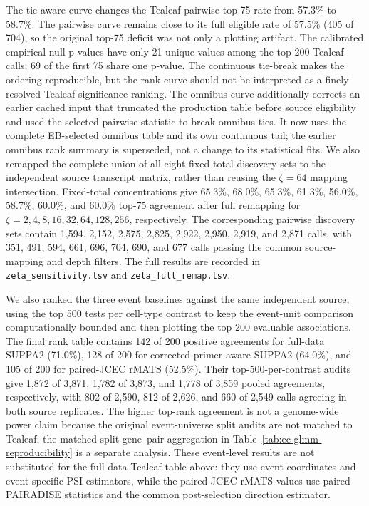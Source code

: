 \documentclass[11pt]{article}
\begin{document}
The tie-aware curve changes the Tealeaf pairwise top-75 rate from 57.3\% to 58.7\%. The pairwise curve remains close to its full eligible rate of 57.5\% (405 of 704), so the original top-75 deficit was not only a plotting artifact. The calibrated empirical-null p-values have only 21 unique values among the top 200 Tealeaf calls; 69 of the first 75 share one p-value. The continuous tie-break makes the ordering reproducible, but the rank curve should not be interpreted as a finely resolved Tealeaf significance ranking. The omnibus curve additionally corrects an earlier cached input that truncated the production table before source eligibility and used the selected pairwise statistic to break omnibus ties. It now uses the complete EB-selected omnibus table and its own continuous tail; the earlier omnibus rank summary is superseded, not a change to its statistical fits. We also remapped the complete union of all eight fixed-total discovery sets to the independent source transcript matrix, rather than reusing the \(\zeta=64\) mapping intersection. Fixed-total concentrations give 65.3\%, 68.0\%, 65.3\%, 61.3\%, 56.0\%, 58.7\%, 60.0\%, and 60.0\% top-75 agreement after full remapping for \(\zeta=2,4,8,16,32,64,128,256\), respectively. The corresponding pairwise discovery sets contain 1,594, 2,152, 2,575, 2,825, 2,922, 2,950, 2,919, and 2,871 calls, with 351, 491, 594, 661, 696, 704, 690, and 677 calls passing the common source-mapping and depth filters. The full results are recorded in \texttt{zeta\_sensitivity.tsv} and \texttt{zeta\_full\_remap.tsv}.

We also ranked the three event baselines against the same independent source, using the top 500 tests per cell-type contrast to keep the event-unit comparison computationally bounded and then plotting the top 200 evaluable associations. The final rank table contains 142 of 200 positive agreements for full-data SUPPA2 (71.0\%), 128 of 200 for corrected primer-aware SUPPA2 (64.0\%), and 105 of 200 for paired-JCEC rMATS (52.5\%). Their top-500-per-contrast audits give 1,872 of 3,871, 1,782 of 3,873, and 1,778 of 3,859 pooled agreements, respectively, with 802 of 2,590, 812 of 2,626, and 660 of 2,549 calls agreeing in both source replicates. The higher top-rank agreement is not a genome-wide power claim because the original event-universe split audits are not matched to Tealeaf; the matched-split gene--pair aggregation in Table~\ref{tab:ec-glmm-reproducibility} is a separate analysis. These event-level results are not substituted for the full-data Tealeaf table above: they use event coordinates and event-specific PSI estimators, while the paired-JCEC rMATS values use paired PAIRADISE statistics and the common post-selection direction estimator.
\end{document}
